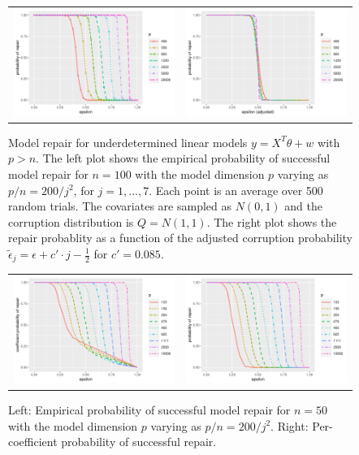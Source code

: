 \begin{figure}[ht]
  \begin{center}
    \begin{tabular}{cc}
      \includegraphics[width=.47\textwidth]{figures/fig3a} &
      \includegraphics[width=.47\textwidth]{figures/fig3b}\\[-10pt]
    \end{tabular}
    \caption{Model repair for underdetermined linear models $y=X^T\theta + w$ with $p>n$. The left plot shows the empirical probability of successful model repair for $n=100$ with the model dimension $p$
    varying as $p/n = 200 /j^2$, for $j=1,\ldots, 7$. Each point is an average over 500 random trials. The covariates are sampled as $N(0,1)$ and the corruption distribution is $Q=N(1,1)$. The right plot shows the repair probablity as a function
    of the adjusted corruption probability $\tilde\epsilon_j = \epsilon + c'\cdot j - \frac{1}{2}$ for $c'=0.085$.}
    \label{fig:exp1}
    \vskip10pt
    \begin{tabular}{cc}
      \includegraphics[width=.47\textwidth]{figures/fig4a} &
      \includegraphics[width=.47\textwidth]{figures/fig4b}\\[-10pt]
    \end{tabular}
  \end{center}
\caption{Left: Empirical probability of successful model repair for $n=50$ with the model dimension $p$
varying as $p/n = 200 /j^2$. Right: Per-coefficient probability of successful repair.}
\label{fig:exp1b}
\end{figure}


